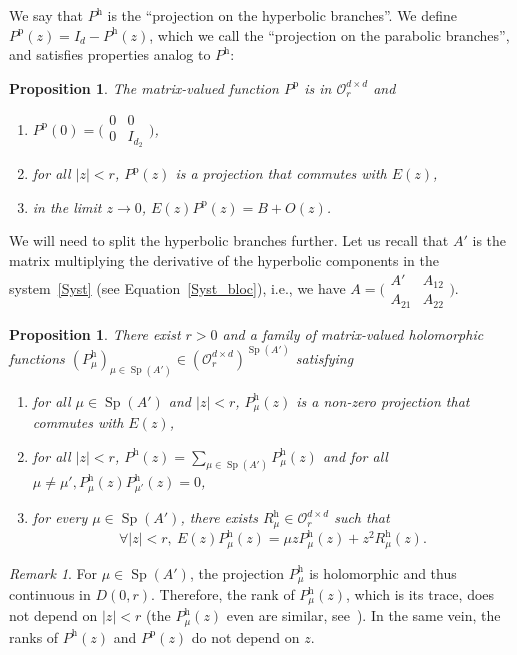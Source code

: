 \documentclass[11pt]{article}
\newcommand{\ie}{i.e.,\xspace}
\let\mathcal\mathscr
\theoremstyle{plain}
\newtheorem{prop}[theorem]{Proposition}
\theoremstyle{definition}
\theoremstyle{remark}
\newtheorem{remark}[theorem]{Remark}
\DeclareMathOperator{\Sp}{Sp}
\let\bigO O
\newcommand{\hol}{{\mathcal O}}
\newcommand{\h}{{\mathrm h}}
\newcommand{\p}{{\mathrm p}}
\begin{document}
We say that $P^\h$ is the ``projection on the hyperbolic branches''. We define $P^\p(z) = I_d - P^\h(z)$, which we call the ``projection on the parabolic branches'', and satisfies properties analog to $P^\h$:
\begin{prop}\label{th:perturb_parab}
The matrix-valued function $P^\p$ is in $\hol_{r}^{d\times d}$ and
\begin{enumerate}
\item $P^\p(0) = \big(\begin{smallmatrix}0&0\\0&I_{d_2} \end{smallmatrix} \big)$,
\item for all $|z|<r$, $P^\p(z)$ is a projection that commutes with $E(z)$,
\item in the limit $z\to 0$, $E(z)P^\p(z) = B + \bigO(z)$.
\end{enumerate}
\end{prop}

We will need to split the hyperbolic branches further. Let us recall that $A'$ is the matrix multiplying the derivative of the hyperbolic components in the system~\eqref{Syst} (see Equation~\eqref{Syst_bloc}), \ie we have $A = \big(\begin{smallmatrix}A'&A_{12}\\A_{21}&A_{22}\end{smallmatrix}\big)$.
\begin{prop}\label{th:perturb}
There exist $r>0$ and a family of matrix-valued holomorphic functions $(P_\mu^\h)_{\mu\in\Sp(A')} \in (\hol_{r}^{d\times d})^{\Sp(A')}$ satisfying
\begin{enumerate}
\item
\label{eigenprojection}
for all $\mu \in \Sp(A')$ and $|z|<r$, $P_\mu^\h(z)$ is a non-zero projection that commutes with $E(z)$,
\item
\label{Decompeigenprojection}
for all $|z|<r$, $P^\h(z) = \sum_{\mu \in \Sp(A')} P^\h_\mu(z)$ and for all $\mu\neq \mu', P_\mu^\h(z) P_{\mu'}^\h(z) = 0$,
\item
\label{defAsymHyp}
for every $\mu\in \Sp(A')$, there exists $R_\mu^{\h} \in \mathcal{O}_{r}^{d\times d}$ such that
\begin{equation*}
\forall |z|<r,\ E(z)P_\mu^\h(z) = \mu z P_\mu^\h(z) + z^2R_\mu^\h(z).
\end{equation*}
\end{enumerate}
\end{prop}

\begin{remark}
\label{RmkRk}
For $\mu \in \Sp(A')$, the projection $P_\mu^\h$ is holomorphic and thus continuous in $D(0,r)$. Therefore, the rank of $P_\mu^\h(z)$, which is its trace, does not depend on $|z|<r$ (the $P_\mu^\h(z)$ even are similar, see~\cite[Ch.\,I, \S4.6, Lem.\,4.10]{kato_1995}). In the same vein, the ranks of $P^\h(z)$ and $P^\p(z)$ do not depend on $z$.
\end{remark}
\end{document}
